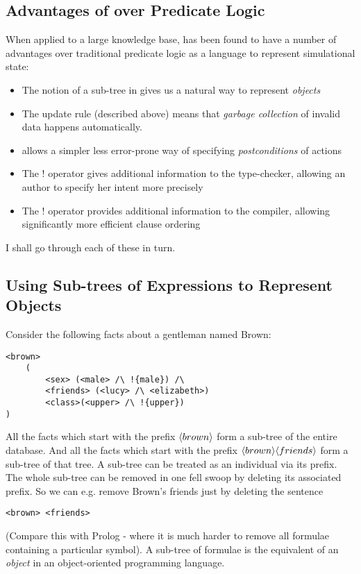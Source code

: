\subsection{Advantages of \ELABR{} over Predicate Logic}

When applied to a large knowledge base, \ELFULL{} has been found to have a number of advantages over traditional predicate logic as a language to represent simulational state:
\begin{itemize}
\item
The notion of a sub-tree in \ELABR{} gives us a natural way to represent \emph{objects}
\item
The update rule (described above) means that \emph{garbage collection} of invalid data happens automatically.
\item
\ELABR{} allows a simpler less error-prone way of specifying \emph{postconditions} of actions
\item
The $!$ operator gives additional information to the type-checker, allowing an author to specify her intent more precisely
\item
The $!$ operator provides additional information to the compiler, allowing significantly more efficient clause ordering
\end{itemize}
I shall go through each of these in turn.

\subsection{Using Sub-trees of Expressions to Represent Objects}
Consider the following facts about a gentleman named Brown:
\begin{verbatim}
<brown>
    (
        <sex> (<male> /\ !{male}) /\
        <friends> (<lucy> /\ <elizabeth>)
        <class>(<upper> /\ !{upper})
)
\end{verbatim}
All the facts which start with the prefix $\MAY{brown}$ form a sub-tree of the entire database.
And all the facts which start with the prefix $\MAY{brown} \MAY{friends}$ form a sub-tree of that tree.
A sub-tree can be treated as an individual via its prefix.
The whole sub-tree can be removed in one fell swoop by deleting its associated prefix.
So we can e.g. remove Brown's friends just by deleting the sentence
\begin{verbatim}
<brown> <friends>
\end{verbatim}
(Compare this with Prolog - where it is much harder to remove all formulae containing a particular symbol).
A sub-tree of formulae is the \ELABR{} equivalent of an \emph{object} in an object-oriented programming language.

